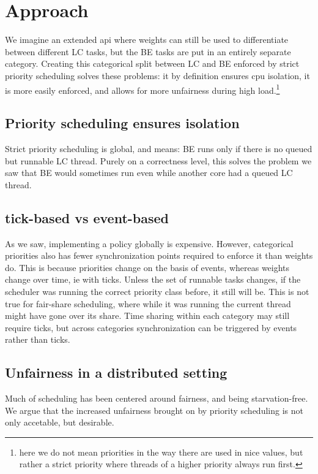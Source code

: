 \section{Approach}\label{s:approach}

We imagine an extended \cgroups{} api where weights can still be used to
differentiate between different LC tasks, but the BE tasks are put in an
entirely separate category. Creating this categorical split between LC and BE
enforced by strict priority scheduling solves these problems: it by definition
ensures cpu isolation, it is more easily enforced, and allows for more
unfairness during high load.\footnote{here we do not mean priorities in the way
there are used in nice values, but rather a strict priority where threads of a
higher priority always run first.}

\subsection{Priority scheduling ensures isolation}

Strict priority scheduling is global, and means: BE runs only if there is no
queued but runnable LC thread. Purely on a correctness level, this solves the
problem we saw that BE would sometimes run even while another core had a queued
LC thread.

\subsection{tick-based vs event-based}

As we saw, implementing a policy globally is expensive. However, categorical
priorities also has fewer synchronization points required to enforce it than
weights do. This is because priorities change on the basis of events, whereas
weights change over time, ie with ticks. Unless the set of runnable tasks
changes, if the scheduler was running the correct priority class before, it
still will be. This is not true for fair-share scheduling, where while it was
running the current thread might have gone over its share. Time sharing within
each category may still require ticks, but across categories synchronization can
be triggered by events rather than ticks.

\subsection{Unfairness in a distributed setting}

Much of scheduling has been centered around fairness, and being starvation-free.
We argue that the increased unfairness brought on by priority scheduling is not
only accetable, but desirable.

